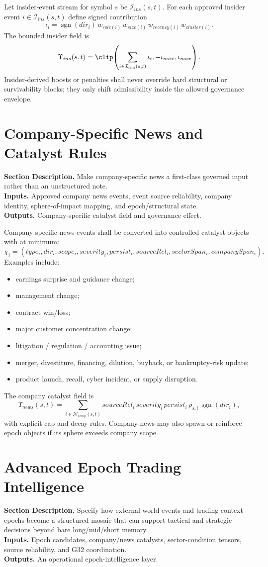 \documentclass[11pt]{report}
\newcommand{\meta}[3]{\textbf{Section Description.} #1\\
\textbf{Inputs.} #2\\
\textbf{Outputs.} #3\par}
\begin{document}
Let insider-event stream for symbol $s$ be $\mathcal{I}_{ins}(s,t)$. For each approved insider event $i\in\mathcal{I}_{ins}(s,t)$ define signed contribution
\[
\iota_i = \operatorname{sgn}(dir_i)\,w_{role(i)}\,w_{size(i)}\,w_{recency(i)}\,w_{cluster(i)}.
\]
The bounded insider field is
\[
\Upsilon_{ins}(s,t)=\clip\!\left(\sum_{i\in\mathcal{I}_{ins}(s,t)} \iota_i,-\iota_{max},\iota_{max}\right).
\]
Insider-derived boosts or penalties shall never override hard structural or survivability blocks; they only shift admissibility inside the allowed governance envelope.

\section{Company-Specific News and Catalyst Rules}
\meta{Make company-specific news a first-class governed input rather than an unstructured note.}{Approved company news events, event source reliability, company identity, sphere-of-impact mapping, and epoch/structural state.}{Company-specific catalyst field and governance effect.}

Company-specific news events shall be converted into controlled catalyst objects with at minimum:
\[
\chi_i=(type_i,dir_i,scope_i,severity_i,persist_i,sourceRel_i,sectorSpan_i,companySpan_i).
\]
Examples include:
\begin{itemize}
    \item earnings surprise and guidance change;
    \item management change;
    \item contract win/loss;
    \item major customer concentration change;
    \item litigation / regulation / accounting issue;
    \item merger, divestiture, financing, dilution, buyback, or bankruptcy-risk update;
    \item product launch, recall, cyber incident, or supply disruption.
\end{itemize}
The company catalyst field is
\[
\Upsilon_{news}(s,t)=\sum_{i\in\mathcal{N}_{comp}(s,t)} sourceRel_i\,severity_i\,persist_i\,\rho_{s,i}\,\operatorname{sgn}(dir_i),
\]
with explicit cap and decay rules. Company news may also spawn or reinforce epoch objects if its sphere exceeds company scope.

\section{Advanced Epoch Trading Intelligence}
\meta{Specify how external world events and trading-context epochs become a structured mosaic that can support tactical and strategic decisions beyond bare long/mid/short memory.}{Epoch candidates, company/news catalysts, sector-condition tensors, source reliability, and G32 coordination.}{An operational epoch-intelligence layer.}
\end{document}
